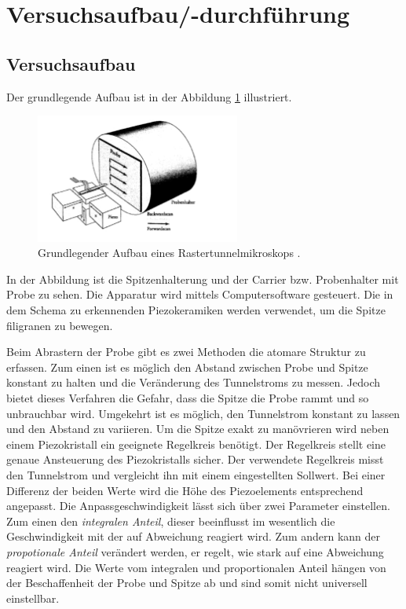 \section{Versuchsaufbau/-durchführung}

\subsection{Versuchsaufbau}
Der grundlegende Aufbau ist in der Abbildung \ref{fig: aufbau} illustriert.
\begin{figure}[!h]
  \centering
  \includegraphics[width=0.6\textwidth]{./pics/aufbau.png}
  \caption{Grundlegender Aufbau eines Rastertunnelmikroskops \cite{anleitung_frankfurt}.}
  \label{fig: aufbau}
\end{figure}
In der Abbildung ist die Spitzenhalterung und
der Carrier bzw. Probenhalter mit Probe zu sehen. Die Apparatur wird mittels Computersoftware gesteuert.
Die in dem Schema zu erkennenden Piezokeramiken werden
verwendet, um die Spitze filigranen zu bewegen. %

Beim Abrastern der Probe gibt es zwei Methoden die atomare Struktur zu erfassen.
Zum einen ist es möglich den Abstand zwischen Probe und Spitze konstant zu halten
und die Veränderung des Tunnelstroms zu messen. %
Jedoch bietet dieses Verfahren die Gefahr, dass die Spitze die Probe rammt und so unbrauchbar wird.
Umgekehrt ist es möglich, den Tunnelstrom konstant zu lassen und den Abstand zu variieren.
Um die Spitze exakt zu manövrieren wird neben einem Piezokristall ein geeignete Regelkreis benötigt. %
Der Regelkreis stellt eine genaue Ansteuerung des Piezokristalls sicher.
Der verwendete Regelkreis misst den Tunnelstrom und vergleicht ihn mit einem
eingestellten Sollwert. Bei einer Differenz der beiden Werte wird die Höhe des Piezoelements
entsprechend angepasst. Die Anpassgeschwindigkeit lässt sich über zwei Parameter
einstellen. Zum einen den \emph{integralen Anteil}, dieser beeinflusst im wesentlich die %
Geschwindigkeit mit der auf Abweichung reagiert wird. Zum andern kann der %
\emph{propotionale Anteil} verändert werden,
er regelt, wie stark auf eine Abweichung reagiert wird.
Die Werte vom integralen und proportionalen Anteil hängen von der Beschaffenheit
der Probe und Spitze ab \cite{anleitung_frankfurt} und sind somit nicht universell einstellbar.

